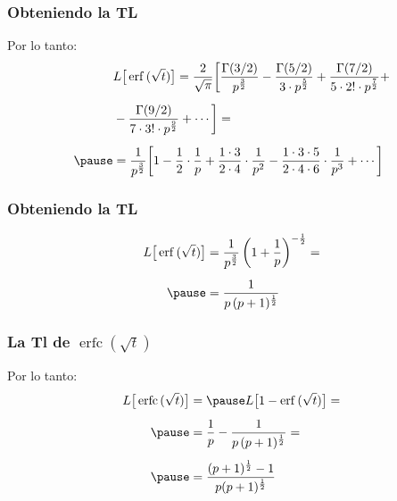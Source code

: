\documentclass[12pt]{beamer}
\DeclareMathOperator\erfc{erfc}
\begin{document}
\begin{frame}
\frametitle{Obteniendo la TL}
Por lo tanto:
\pause
\begin{eqnarray*}
\begin{aligned}
&L \big[ \erf \, (\sqrt{t}) \big] = \dfrac{2}{\sqrt{\pi}} \bigg[ \dfrac{\Gamma (3/2)}{p^{\frac{3}{2}}} - \dfrac{\Gamma (5/2)}{3 \cdot p^{\frac{5}{2}}} + \dfrac{\Gamma (7/2)}{5 \cdot 2! \cdot p^{\frac{7}{2}}} + \\[0.5em]
&- \dfrac{\Gamma (9/2)}{7 \cdot 3! \cdot p^{\frac{9}{2}}} + \cdots \bigg] = \\[0.5em] \pause
&= \dfrac{1}{p^{\frac{3}{2}}} \bigg[ 1 - \dfrac{1}{2} \cdot \dfrac{1}{p} + \dfrac{1 \cdot 3}{2 \cdot 4} \cdot \dfrac{1}{p^{2}} - \dfrac{1 \cdot 3 \cdot 5}{2 \cdot 4 \cdot 6} \cdot \dfrac{1}{p^{3}} + \cdots \bigg]
\end{aligned}
\end{eqnarray*}
\end{frame}
\begin{frame}
\frametitle{Obteniendo la TL}
\begin{eqnarray}
\begin{aligned}[b]
L \big[ \erf \, (\sqrt{t}) \big] &= \dfrac{1}{p^{\frac{3}{2}}} \, \bigg( 1 + \dfrac{1}{p} \bigg)^{-\frac{1}{2}} = \\[0.5em] \pause
&= \dfrac{1}{p \, (p + 1)^{\frac{1}{2}}}
\end{aligned}
\label{eq:ecuacion_03_39}
\end{eqnarray}
\end{frame}
\begin{frame}
\frametitle{La Tl de $\erfc (\sqrt{t})$}
Por lo tanto:
\pause
\begin{eqnarray}
\begin{aligned}[b]
L \big[ \erfc \, (\sqrt{t}) \big] &= \pause L \big[ 1 - \erf \, (\sqrt{t}) \big] = \\[0.5em] \pause
&= \dfrac{1}{p} - \dfrac{1}{p \, (p + 1)^{\frac{1}{2}}} = \\[0.5em] \pause
&= \dfrac{(p + 1)^{\frac{1}{2}} - 1}{p (p + 1)^{\frac{1}{2}}}
\end{aligned}
\label{eq:ecuacion_03_40}
\end{eqnarray}
\end{frame}
\end{document}
